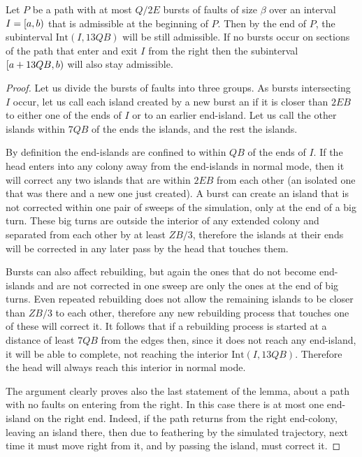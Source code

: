 \documentclass[11pt]{memoir}
\theoremstyle{definition} %
\def\B{B}
\newcommand{\E}{E} %
\newcommand{\Int}{\mathrm{Int}} %
\newcommand{\Q}{Q} %
\newcommand{\Z}{Z} %
\begin{document}
\begin{lemma}\label{lem:k-bursts}
  Let \( P \) be a path with at most \( \Q/2\E \) bursts of faults of size \( \beta \)
  over an interval \( I = \left[a,b\right) \) that is admissible at the beginning of \( P \).
  Then by the end of \( P \), the subinterval \( \Int(I, 13\Q\B) \) will be still admissible.
  If no bursts occur on sections of the path that enter and exit \( I \) from the right then
  the subinterval \( \lint{a+13\Q\B}{b} \) will also stay admissible.
\end{lemma}
\begin{proof}
  Let us divide the bursts of faults into three groups.
  As bursts intersecting \( I \) occur, let us call each island created by a new burst
  an  if it is closer than \( 2\E\B \) to either one of the ends of \( I \) or to
  an earlier end-island.
  Let us call the other islands within \( 7\Q\B \) of the ends the  islands, and the rest the
   islands.

  By definition the end-islands are confined to within \( \Q\B \) of the ends of \( I \).
  If the head enters into any colony away from the end-islands in normal mode,
  then it will correct any two islands that are within \( 2\E\B \) from each other (an isolated
  one that was there and a new one just created).
  A burst can create an island that is not corrected within one pair of sweeps of the simulation,
  only at the end of a big turn.
  These big turns are outside the interior of any extended colony %
  and separated from each other
  by at least \( \Z\B/3 \), therefore the islands at their ends
  will be corrected in any later pass by the head that touches them.

  Bursts can also affect rebuilding, but again the ones that do not become end-islands and
  are not corrected in one sweep are only the ones at the end of big turns.
  Even repeated rebuilding does not allow the remaining islands to be closer than \( \Z\B/3 \) to
  each other, therefore any new rebuilding process that touches one of these will correct it.
  It follows that if a rebuilding process is started at a distance of least \( 7\Q\B \) from the edges
  then, since it does not reach any end-island, it will be able to complete, not reaching the interior
  \( \Int(I,13\Q\B) \).
  Therefore the head will always reach this interior in normal mode.

  The argument clearly proves also the last statement of the lemma,
  about a path with no faults on entering from the right.
  In this case there is at most one end-island on the right end.
  Indeed, if the path returns from the right end-colony, leaving an island there,
  then due to feathering by the simulated trajectory, next time it must move right from it,
  and by passing the island, must correct it.
  \end{proof}
\end{document}

